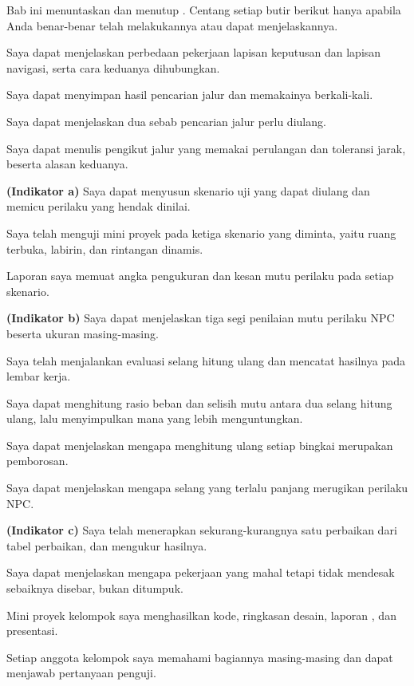 
Bab ini menuntaskan  dan menutup . Centang setiap butir
berikut hanya apabila Anda benar-benar telah melakukannya atau dapat
menjelaskannya.

\begin{checklistbox}
\begin{checklist}
  \item Saya dapat menjelaskan perbedaan pekerjaan lapisan keputusan dan
        lapisan navigasi, serta cara keduanya dihubungkan.
  \item Saya dapat menyimpan hasil pencarian jalur dan memakainya berkali-kali.
  \item Saya dapat menjelaskan dua sebab pencarian jalur perlu diulang.
  \item Saya dapat menulis pengikut jalur yang memakai perulangan
         dan toleransi jarak, beserta alasan keduanya.
  \item {\bfseries (Indikator a)} Saya dapat menyusun skenario uji yang dapat
        diulang dan memicu perilaku yang hendak dinilai.
  \item Saya telah menguji mini proyek pada ketiga skenario yang diminta,
        yaitu ruang terbuka, labirin, dan rintangan dinamis.
  \item Laporan  saya memuat angka pengukuran dan kesan mutu
        perilaku pada setiap skenario.
  \item {\bfseries (Indikator b)} Saya dapat menjelaskan tiga segi penilaian
        mutu perilaku NPC beserta ukuran masing-masing.
  \item Saya telah menjalankan evaluasi selang hitung ulang dan mencatat
        hasilnya pada lembar kerja.
  \item Saya dapat menghitung rasio beban dan selisih mutu antara dua selang
        hitung ulang, lalu menyimpulkan mana yang lebih menguntungkan.
  \item Saya dapat menjelaskan mengapa menghitung ulang setiap bingkai
        merupakan pemborosan.
  \item Saya dapat menjelaskan mengapa selang yang terlalu panjang merugikan
        perilaku NPC.
  \item {\bfseries (Indikator c)} Saya telah menerapkan sekurang-kurangnya satu
        perbaikan dari tabel perbaikan, dan mengukur hasilnya.
  \item Saya dapat menjelaskan mengapa pekerjaan yang mahal tetapi tidak
        mendesak sebaiknya disebar, bukan ditumpuk.
  \item Mini proyek kelompok saya menghasilkan kode, ringkasan desain, laporan
        , dan presentasi.
  \item Setiap anggota kelompok saya memahami bagiannya masing-masing dan
        dapat menjawab pertanyaan penguji.
\end{checklist}
\end{checklistbox}
